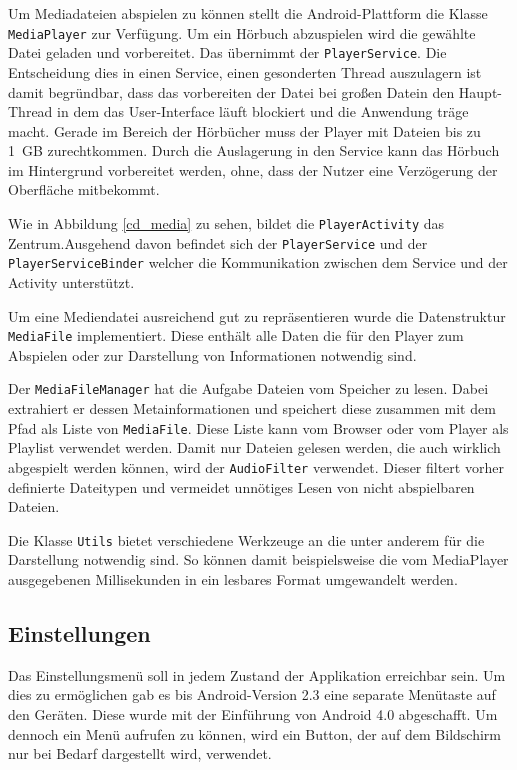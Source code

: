 Um Mediadateien abspielen zu können stellt die Android-Plattform die Klasse \verb+MediaPlayer+ zur Verfügung. Um ein Hörbuch abzuspielen wird die gewählte Datei geladen und vorbereitet. Das übernimmt der \verb+PlayerService+. Die Entscheidung dies in einen Service, einen gesonderten Thread auszulagern ist damit begründbar, dass das vorbereiten der Datei bei großen Datein den Haupt-Thread in dem das User-Interface läuft blockiert und die Anwendung träge macht. Gerade im Bereich der Hörbücher muss der Player mit Dateien bis zu \SI{1}{GB} zurechtkommen. Durch die Auslagerung in den Service kann das Hörbuch im Hintergrund vorbereitet werden, ohne, dass der Nutzer eine Verzögerung der Oberfläche mitbekommt.

Wie in Abbildung \ref{cd_media} zu sehen, bildet die \verb+PlayerActivity+ das Zentrum.Ausgehend davon befindet sich der \verb+PlayerService+ und der \verb+PlayerServiceBinder+ welcher die Kommunikation zwischen dem Service und der Activity unterstützt.

Um eine Mediendatei ausreichend gut zu repräsentieren wurde die Datenstruktur \verb+MediaFile+ implementiert. Diese enthält alle Daten die für den Player zum Abspielen oder zur Darstellung von Informationen notwendig sind. 

Der \verb+MediaFileManager+ hat die Aufgabe Dateien vom Speicher zu lesen. Dabei extrahiert er dessen Metainformationen und speichert diese zusammen mit dem Pfad als Liste von \verb+MediaFile+. Diese Liste kann vom Browser oder vom Player als Playlist verwendet werden. Damit nur Dateien gelesen werden, die auch wirklich abgespielt werden können, wird der \verb+AudioFilter+ verwendet. Dieser filtert vorher definierte Dateitypen und vermeidet unnötiges Lesen von nicht abspielbaren Dateien.

Die Klasse \verb+Utils+ bietet verschiedene Werkzeuge an die unter anderem für die Darstellung notwendig sind. So können damit beispielsweise die vom MediaPlayer ausgegebenen Millisekunden in ein lesbares Format umgewandelt werden.

\subsection{Einstellungen}

Das Einstellungsmenü soll in jedem Zustand der Applikation erreichbar sein. Um dies zu ermöglichen gab es bis Android-Version 2.3 eine separate Menütaste auf den Geräten. Diese wurde mit der Einführung von Android 4.0 abgeschafft. Um dennoch ein Menü aufrufen zu können, wird ein Button, der auf dem Bildschirm nur bei Bedarf dargestellt wird, verwendet.

